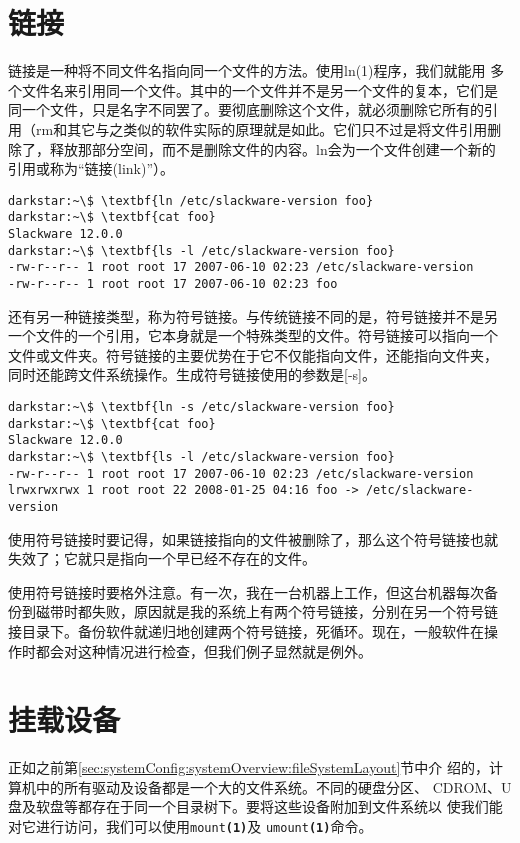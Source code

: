 \section{链接}
\label{sec:filesystemStructure:links}
链接是一种将不同文件名指向同一个文件的方法。使用ln(1)程序，我们就能用
多个文件名来引用同一个文件。其中的一个文件并不是另一个文件的复本，它们是
同一个文件，只是名字不同罢了。要彻底删除这个文件，就必须删除它所有的引
用（rm和其它与之类似的软件实际的原理就是如此。它们只不过是将文件引用删
除了，释放那部分空间，而不是删除文件的内容。ln会为一个文件创建一个新的
引用或称为``链接(link)''）。

\begin{Verbatim}[frame=single, commandchars=\\\{\}]
darkstar:~\$ \textbf{ln /etc/slackware-version foo}
darkstar:~\$ \textbf{cat foo}
Slackware 12.0.0
darkstar:~\$ \textbf{ls -l /etc/slackware-version foo}
-rw-r--r-- 1 root root 17 2007-06-10 02:23 /etc/slackware-version
-rw-r--r-- 1 root root 17 2007-06-10 02:23 foo
\end{Verbatim}
还有另一种链接类型，称为符号链接。与传统链接不同的是，符号链接并不是另
一个文件的一个引用，它本身就是一个特殊类型的文件。符号链接可以指向一个
文件或文件夹。符号链接的主要优势在于它不仅能指向文件，还能指向文件夹，
同时还能跨文件系统操作。生成符号链接使用的参数是[-s]。

\begin{Verbatim}[frame=single, commandchars=\\\{\}]
darkstar:~\$ \textbf{ln -s /etc/slackware-version foo}
darkstar:~\$ \textbf{cat foo}
Slackware 12.0.0
darkstar:~\$ \textbf{ls -l /etc/slackware-version foo}
-rw-r--r-- 1 root root 17 2007-06-10 02:23 /etc/slackware-version
lrwxrwxrwx 1 root root 22 2008-01-25 04:16 foo -> /etc/slackware-version
\end{Verbatim}

使用符号链接时要记得，如果链接指向的文件被删除了，那么这个符号链接也就
失效了；它就只是指向一个早已经不存在的文件。

使用符号链接时要格外注意。有一次，我在一台机器上工作，但这台机器每次备
份到磁带时都失败，原因就是我的系统上有两个符号链接，分别在另一个符号链
接目录下。备份软件就递归地创建两个符号链接，死循环。现在，一般软件在操
作时都会对这种情况进行检查，但我们例子显然就是例外。

\section{挂载设备}
\label{sec:filesystemStructure:mouting}
正如之前第\ref{sec:systemConfig:systemOverview:fileSystemLayout}节中介
绍的，计算机中的所有驱动及设备都是一个大的文件系统。不同的硬盘分区、
CDROM、U盘及软盘等都存在于同一个目录树下。要将这些设备附加到文件系统以
使我们能对它进行访问，我们可以使用\texttt{mount\textbf{(1)}}及
\texttt{umount\textbf{(1)}}命令。

